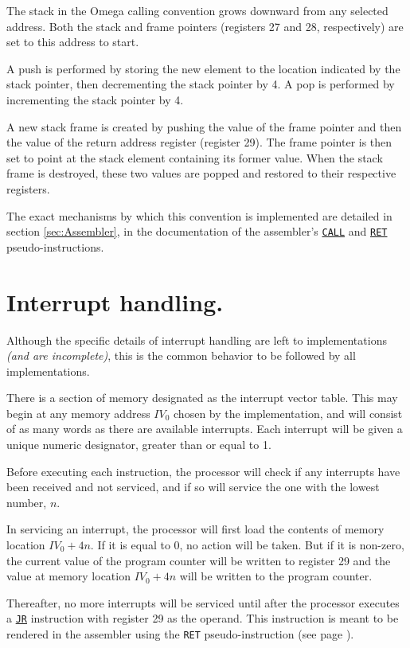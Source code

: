 \documentclass[12pt,english,twoside]{report}
\def\code{\texttt}
\newcommand\incomplete[1]{{\color{red}\it #1}}
\newcommand\machineinst[1]{\hyperref[sec:Ins_#1]{\code{#1}}}
\begin{document}
The stack in the Omega calling convention grows downward from any
selected address. Both the stack and frame pointers (registers 27 and
28, respectively) are set to this address to start.

A push is performed by storing the new element to the location
indicated by the stack pointer, then decrementing the stack pointer by
4. A pop is performed by incrementing the stack pointer by 4.

A new stack frame is created by pushing the value of the frame pointer
and then the value of the return address register (register 29). The
frame pointer is then set to point at the stack element containing its
former value. When the stack frame is destroyed, these two values are
popped and restored to their respective registers.

The exact mechanisms by which this convention is implemented are
detailed in section \ref{sec:Assembler}, in the documentation of the
assembler's \hyperref[Asm_CALL]{\code{CALL}} and
\hyperref[Asm_RET]{\code{RET}} pseudo-instructions.

\section{\label{sec:Interrupts} Interrupt handling.}

Although the specific details of interrupt handling are left to
implementations\incomplete{ (and are incomplete)}, this is the common
behavior to be followed by all implementations.

There is a section of memory designated as the interrupt vector table.
This may begin at any memory address $IV_0$ chosen by the
implementation, and will consist of as many words as there are
available interrupts. Each interrupt will be given a unique numeric
designator, greater than or equal to 1.

Before executing each instruction, the processor will check if any
interrupts have been received and not serviced, and if so will service
the one with the lowest number, $n$.

In servicing an interrupt, the processor will first load the contents
of memory location $IV_0 + 4n$. If it is equal to 0, no action
will be taken. But if it is non-zero, the current value of the program
counter will be written to register 29 and the value at memory
location $IV_0 + 4n$ will be written to the program counter.

Thereafter, no more interrupts will be serviced until after the
processor executes a \machineinst{JR} instruction with register 29 as
the operand. This instruction is meant to be rendered in the assembler
using the \code{RET} pseudo-instruction (see page \pageref{Asm_RET}).
\end{document}
